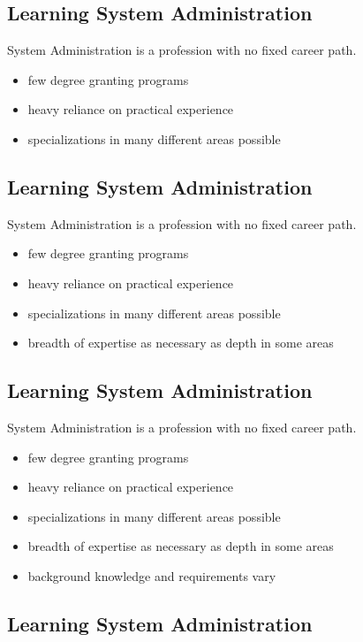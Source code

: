 \documentclass[xga]{xdvislides}
\begin{document}
\subsection{Learning System Administration}
System Administration is a profession with no fixed career path.

\begin{itemize}
	\item few degree granting programs
	\item heavy reliance on practical experience
	\item specializations in many different areas possible
\end{itemize}

\subsection{Learning System Administration}
System Administration is a profession with no fixed career path.

\begin{itemize}
	\item few degree granting programs
	\item heavy reliance on practical experience
	\item specializations in many different areas possible
	\item breadth of expertise as necessary as depth in some areas
\end{itemize}


\subsection{Learning System Administration}
System Administration is a profession with no fixed career path.

\begin{itemize}
	\item few degree granting programs
	\item heavy reliance on practical experience
	\item specializations in many different areas possible
	\item breadth of expertise as necessary as depth in some areas
	\item background knowledge and requirements vary
\end{itemize}

\subsection{Learning System Administration}
\end{document}
